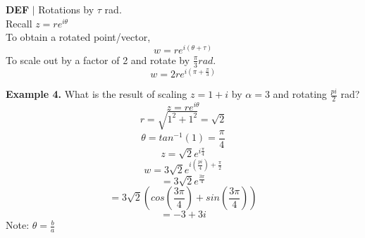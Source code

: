 \documentclass [12pt]{article}
\begin{document}
\begin{framed}
    \noindent\textbf{DEF} $|$ Rotations by $\tau$ rad.\\
    Recall $z=re^{i\theta}$\\
    To obtain a rotated point/vector,
    \[w=re^{i(\theta+\tau)}\]
    To scale out by a factor of 2 and rotate by $\frac{\pi}{3} rad.$
    \[w=2re^{i(\pi+\frac{\pi}{3})}\]
\end{framed}
\noindent\textbf{Example 4.} What is the result of scaling $z=1+i$ by $\alpha=3$ and rotating $\frac{pi}{2}$ rad?\\
\[z=re^{i\theta}\]
\[r=\sqrt{1^2+1^2} = \sqrt{2}\]
\[\theta = tan^{-1}(1) = \frac{\pi}{4}\]
\[z=\sqrt{2}e^{i\frac{\pi}{4}}\]
\[w=3\sqrt{2}e^{i(\frac{pi}{4}) + \frac{\pi}{2}}\]
\[= 3\sqrt{2}e^{\frac{3\pi}{4}}\]
\[=3\sqrt{2}(cos(\frac{3\pi}{4})+sin(\frac{3\pi}{4}))\]
\[=-3+3i\]
Note: $\theta=\frac{b}{a}$
\end{document}
